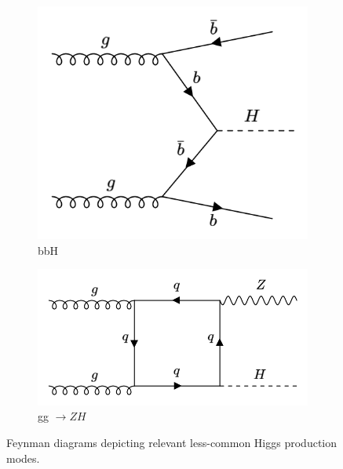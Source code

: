 \begin{figure}[htp]
  \centering
       \begin{subfigure}[b]{0.3\textwidth}
         \centering
         \includegraphics[width=\textwidth]{figures/theory_chapter/bbH.png}
         \caption{bbH}
         \label{fig:bbH}
     \end{subfigure}
     \hfill
         \begin{subfigure}[b]{0.3\textwidth}
         \centering
         \includegraphics[width=\textwidth]{figures/theory_chapter/ggZH.png}
         \caption{gg $\rightarrow ZH$ }
         \label{fig:ggZH}
     \end{subfigure}
  \label{fig:loopmodes}
  \caption{Feynman diagrams depicting relevant less-common Higgs production modes.}  
\end{figure}

